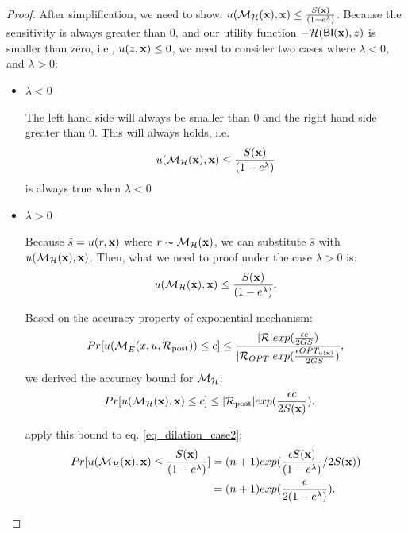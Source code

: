 \documentclass{article}
\begin{document}
\begin{proof}
	After simplification, we need to show: $u(\mathcal{M}_{\mathcal{H}}(\textbf{x}), \textbf{x}) \leq \frac{S(\textbf{x})}{(1 - e ^ {\lambda})}$.
	Because the sensitivity is always greater than 0, and our utility function $-\mathcal{H}(\mathsf{BI}(\textbf{x}),z)$ is smaller than zero, i.e., $u(z,\textbf{x}) \leq 0$, we need to consider two cases where $\lambda < 0$, and $\lambda > 0$:

\begin{itemize}
	\item $\lambda < 0$

		The left hand side will always be smaller than 0 and the right hand side greater than 0. This will always holds, i.e.
		\begin{equation*}
		u(\mathcal{M}_{\mathcal{H}}(\textbf{x}), \textbf{x}) \leq \frac{S(\textbf{x})}{(1 - e ^ {\lambda})}
		\end{equation*}
		is always true when $\lambda < 0$
	\item $\lambda > 0$


		Because $\hat{s} = u(r, \textbf{x})$ where $r \thicksim \mathcal{M}_{\mathcal{H}}(\textbf{x})$, we can substitute $\hat{s}$ with $u(\mathcal{M}_{\mathcal{H}}(\textbf{x}), \textbf{x})$. Then, what we need to proof under the case $\lambda > 0$ is:
		\begin{equation}
		\label{eq_dilation_case2}
		u(\mathcal{M}_{\mathcal{H}}(\textbf{x}), \textbf{x}) \leq \frac{S(\textbf{x})}{(1 - e ^ {\lambda})}.
		\end{equation}

		Based on the accuracy property of exponential mechanism:
		\begin{equation*}
		\begin{split}
		Pr[u(\mathcal{M}_E^{}({x},{u},{\mathcal{R}_{\textup{post}}})) \leq c] 
		& \leq \frac{|\mathcal{R}|exp(\frac{\epsilon c}{2 GS})}{|\mathcal{R}_{OPT}| exp(\frac{\epsilon OPT_{u(\textbf{x})}}{2 GS})},\\
		\end{split}
		\end{equation*}
		we derived the accuracy bound for $\mathcal{M}_{\mathcal{H}}$:
		\begin{equation*}
		\begin{split}
		Pr[u(\mathcal{M}_{\mathcal{H}}(\textbf{x}), \textbf{x}) \leq c] 
		& \leq |\mathcal{R}_{\textup{post}}|exp(\frac{\epsilon c}{2 S(\textbf{x})}).
		\end{split}
		\end{equation*}

		apply this bound to eq. \ref{eq_dilation_case2}:
		\begin{equation*}
		\begin{split}
		Pr[u(\mathcal{M}_{\mathcal{H}}(\textbf{x}), \textbf{x}) \leq \frac{S(\textbf{x})}{(1 - e ^ {\lambda})}] 
		& = (n + 1)exp(\frac{\epsilon S(\textbf{x})}{(1 - e ^ {\lambda})}/2 S(\textbf{x}))\\
		& = (n + 1)exp(\frac{\epsilon}{2 (1 - e ^ {\lambda})}).\\
		\end{split}
		\end{equation*}


\end{itemize}
\end{proof}
\end{document}

